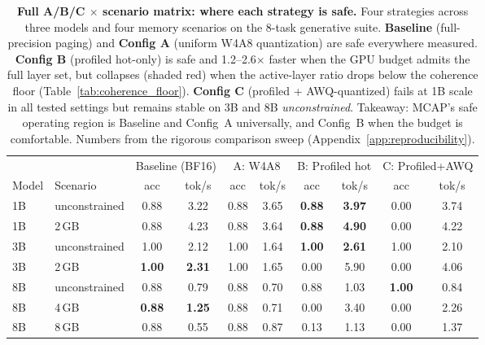 \documentclass{article}
\begin{document}
\begin{table}[H]
\centering
\caption{\textbf{Full A/B/C $\times$ scenario matrix: where each strategy is safe.} Four
strategies across three models and four memory scenarios on the 8-task generative suite.
\textbf{Baseline} (full-precision paging) and \textbf{Config A} (uniform W4A8 quantization)
are safe everywhere measured. \textbf{Config B} (profiled hot-only) is safe and
1.2--2.6$\times$ faster when the GPU budget admits the full layer set, but collapses
(shaded red) when the active-layer ratio drops below the coherence floor
(Table~\ref{tab:coherence_floor}). \textbf{Config C} (profiled + AWQ-quantized) fails at
1B scale in all tested settings but remains stable on 3B and 8B \emph{unconstrained}.
Takeaway: MCAP's safe operating region is Baseline and Config~A universally, and
Config~B when the budget is comfortable. Numbers from the rigorous comparison sweep
(Appendix~\ref{app:reproducibility}).}
\label{tab:abc_matrix}
\small
\begin{tabular}{llcccccccc}
\toprule
& & \multicolumn{2}{c}{Baseline (BF16)} & \multicolumn{2}{c}{A: W4A8} & \multicolumn{2}{c}{B: Profiled hot} & \multicolumn{2}{c}{C: Profiled+AWQ} \\
\cmidrule(lr){3-4} \cmidrule(lr){5-6} \cmidrule(lr){7-8} \cmidrule(lr){9-10}
Model & Scenario & acc & tok/s & acc & tok/s & acc & tok/s & acc & tok/s \\
\midrule
1B & unconstrained  & 0.88 & 3.22 & 0.88 & 3.65 & \textbf{0.88} & \textbf{3.97} & \cellcolor{nvered!20}0.00 & 3.74 \\
1B & 2\,GB          & 0.88 & 4.23 & 0.88 & 3.64 & \textbf{0.88} & \textbf{4.90} & \cellcolor{nvered!20}0.00 & 4.22 \\
3B & unconstrained  & 1.00 & 2.12 & 1.00 & 1.64 & \textbf{1.00} & \textbf{2.61} & 1.00 & 2.10 \\
3B & 2\,GB          & \textbf{1.00} & \textbf{2.31} & 1.00 & 1.65 & \cellcolor{nvered!20}0.00 & 5.90 & \cellcolor{nvered!20}0.00 & 4.06 \\
8B & unconstrained  & 0.88 & 0.79 & 0.88 & 0.70 & 0.88 & 1.03 & \textbf{1.00} & 0.84 \\
8B & 4\,GB          & \textbf{0.88} & \textbf{1.25} & 0.88 & 0.71 & \cellcolor{nvered!20}0.00 & 3.40 & \cellcolor{nvered!20}0.00 & 2.26 \\
8B & 8\,GB          & 0.88 & 0.55 & 0.88 & 0.87 & \cellcolor{nvered!20}0.13 & 1.13 & \cellcolor{nvered!20}0.00 & 1.37 \\
\bottomrule
\end{tabular}
\end{table}
\end{document}
